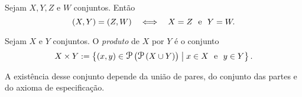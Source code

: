 \begin{prop}
Sejam $X,Y,Z$ e $W$ conjuntos. Então
	\begin{equation*}
	(X,Y) = (Z,W) \quad \Longleftrightarrow \quad X=Z \text{\ \ e\ \ } Y=W.
	\end{equation*}
\end{prop}

\begin{defi}
Sejam $X$ e $Y$ conjuntos. O \emph{produto} de $X$ por $Y$ é o conjunto
	\begin{equation*}
	X \times Y := \set{(x,y) \in \p\left(\p\left(X \cup Y\right)\right)}{x \in X \e y \in Y}.
	\end{equation*}
\end{defi}

A existência desse conjunto depende da união de pares, do conjunto das partes e do axioma de especificação.

%

%

